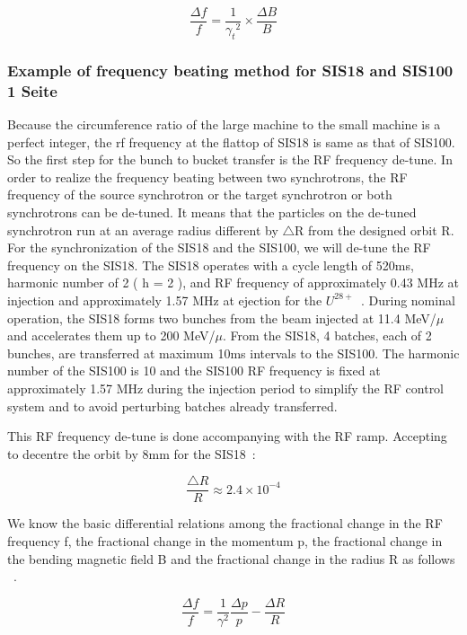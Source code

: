 \begin{equation}
\frac{\Delta{f}}{f} =  \frac{1}{{\gamma_t}^2}\times{\frac{\Delta{B}}{B}}
\label{eq:eq5}
\end{equation}

\subsubsection{Example of frequency beating method for SIS18 and SIS100 1 Seite}
Because the circumference ratio of the large machine to the small machine is a perfect integer, the rf frequency at the flattop of SIS18 is same as that of SIS100. So the first step for the bunch to bucket transfer is the RF frequency de-tune. In order to realize the frequency beating between two synchrotrons, the RF frequency of the source synchrotron or the target synchrotron or both synchrotrons can be de-tuned. It means that the particles on the de-tuned synchrotron run at an average radius different by $\bigtriangleup$R from the designed orbit R. For the synchronization of the SIS18 and the SIS100, we will de-tune the RF frequency on the SIS18. The SIS18 operates with a cycle length of 520ms, harmonic number of 2 ( h = 2 ), and RF frequency of approximately 0.43 MHz at injection and approximately 1.57 MHz at ejection for the $U^{28+}$~\cite{SIS18}. During nominal operation, the SIS18 forms two bunches from the beam injected at 11.4 MeV/$\mu$ and accelerates them up to 200 MeV/$\mu$. From the SIS18, 4 batches, each of 2 bunches, are transferred at  maximum 10ms intervals to the SIS100. The harmonic number of the SIS100 is 10 and the SIS100 RF frequency is fixed at approximately 1.57 MHz during the
injection period to simplify the RF control system and to avoid perturbing batches already transferred.

  This RF frequency de-tune is done accompanying with the RF ramp. Accepting to decentre the orbit by 8mm for the SIS18~\cite{SIS18_man}: 

\begin{equation}
\frac{\bigtriangleup{R}}{R}\approx{2.4}{\times}10^{-4}\label{eq1}
\end{equation}

  We know the basic differential relations among the fractional change in the RF frequency f, the fractional change in the momentum p, the fractional change in the bending magnetic field B and the fractional change in the radius R as follows ~\cite{J-PARC}.


\begin{equation}
\label{eq:eq2}
\frac{\Delta{f}}{f} ={\frac{1}{\gamma^2}}{\frac{\Delta{p}}{p}} - \frac{\Delta{R}}{R}
\end{equation}

